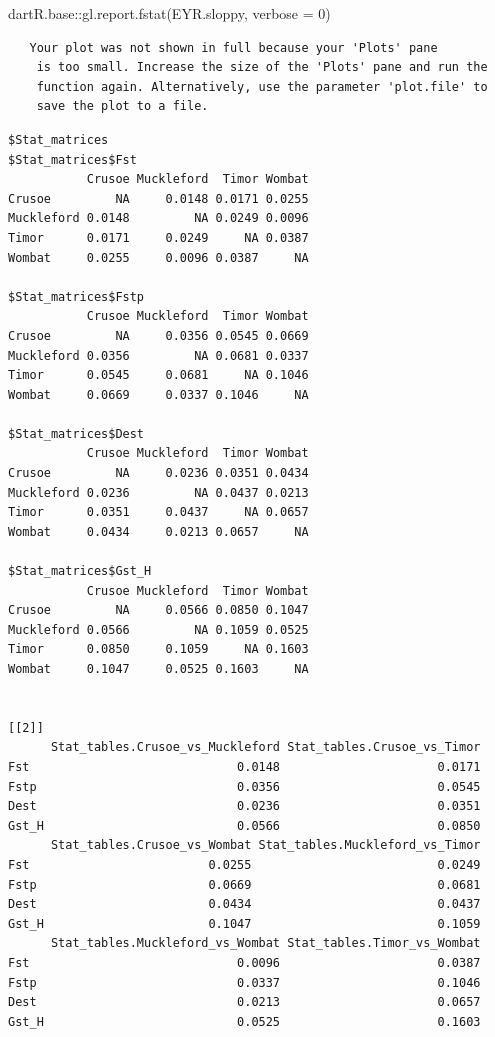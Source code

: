 \documentclass[
  letterpaper,
  DIV=11,
  numbers=noendperiod]{scrreprt}
\newenvironment{Shaded}{\begin{snugshade}}{\end{snugshade}}
\newcommand{\AttributeTok}[1]{\textcolor[rgb]{0.49,0.56,0.16}{#1}}
\newcommand{\DecValTok}[1]{\textcolor[rgb]{0.25,0.63,0.44}{#1}}
\newcommand{\FunctionTok}[1]{\textcolor[rgb]{0.02,0.16,0.49}{#1}}
\newcommand{\NormalTok}[1]{\textcolor[rgb]{0.00,0.44,0.13}{#1}}
\newcommand{\SpecialCharTok}[1]{\textcolor[rgb]{0.25,0.44,0.63}{#1}}
\begin{document}
\begin{Shaded}
\begin{Highlighting}[]
\NormalTok{dartR.base}\SpecialCharTok{::}\FunctionTok{gl.report.fstat}\NormalTok{(EYR.sloppy, }\AttributeTok{verbose =} \DecValTok{0}\NormalTok{)}
\end{Highlighting}
\end{Shaded}

\begin{verbatim}
   Your plot was not shown in full because your 'Plots' pane
    is too small. Increase the size of the 'Plots' pane and run the
    function again. Alternatively, use the parameter 'plot.file' to
    save the plot to a file.
\end{verbatim}

\begin{verbatim}
$Stat_matrices
$Stat_matrices$Fst
           Crusoe Muckleford  Timor Wombat
Crusoe         NA     0.0148 0.0171 0.0255
Muckleford 0.0148         NA 0.0249 0.0096
Timor      0.0171     0.0249     NA 0.0387
Wombat     0.0255     0.0096 0.0387     NA

$Stat_matrices$Fstp
           Crusoe Muckleford  Timor Wombat
Crusoe         NA     0.0356 0.0545 0.0669
Muckleford 0.0356         NA 0.0681 0.0337
Timor      0.0545     0.0681     NA 0.1046
Wombat     0.0669     0.0337 0.1046     NA

$Stat_matrices$Dest
           Crusoe Muckleford  Timor Wombat
Crusoe         NA     0.0236 0.0351 0.0434
Muckleford 0.0236         NA 0.0437 0.0213
Timor      0.0351     0.0437     NA 0.0657
Wombat     0.0434     0.0213 0.0657     NA

$Stat_matrices$Gst_H
           Crusoe Muckleford  Timor Wombat
Crusoe         NA     0.0566 0.0850 0.1047
Muckleford 0.0566         NA 0.1059 0.0525
Timor      0.0850     0.1059     NA 0.1603
Wombat     0.1047     0.0525 0.1603     NA


[[2]]
      Stat_tables.Crusoe_vs_Muckleford Stat_tables.Crusoe_vs_Timor
Fst                             0.0148                      0.0171
Fstp                            0.0356                      0.0545
Dest                            0.0236                      0.0351
Gst_H                           0.0566                      0.0850
      Stat_tables.Crusoe_vs_Wombat Stat_tables.Muckleford_vs_Timor
Fst                         0.0255                          0.0249
Fstp                        0.0669                          0.0681
Dest                        0.0434                          0.0437
Gst_H                       0.1047                          0.1059
      Stat_tables.Muckleford_vs_Wombat Stat_tables.Timor_vs_Wombat
Fst                             0.0096                      0.0387
Fstp                            0.0337                      0.1046
Dest                            0.0213                      0.0657
Gst_H                           0.0525                      0.1603
\end{verbatim}
\end{document}
